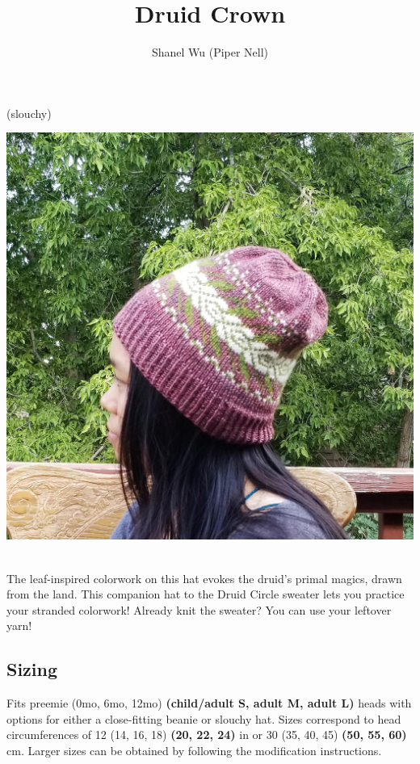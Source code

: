 \documentclass[12pt]{article}
\title{Druid Crown} %
\author{Shanel Wu (Piper Nell)}
\begin{document}
\small


{\selectfont
\HUGE\textbf{\thetitle}
\normalsize(slouchy)
\hspace{\fill} %
\theauthor
}

\raggedright
\begin{multicols}{2}
\includegraphics[width=0.9\linewidth]{worn2}

~\\
The leaf-inspired colorwork on this hat evokes the druid's primal magics, drawn from the land. This companion hat to the Druid Circle sweater lets you practice your stranded colorwork! Already knit the sweater? You can use your leftover yarn!

\subsection*{Sizing}

Fits preemie (0mo, 6mo, 12mo) \textbf{(child/adult S, adult M, adult L)} heads with options for either a close-fitting beanie or slouchy hat. 
Sizes correspond to head circumferences of 12 (14, 16, 18) \textbf{(20, 22, 24)} in or 30 (35, 40, 45) \textbf{(50, 55, 60)} cm.
Larger sizes can be obtained by following the modification instructions.


\end{multicols}
\end{document}
